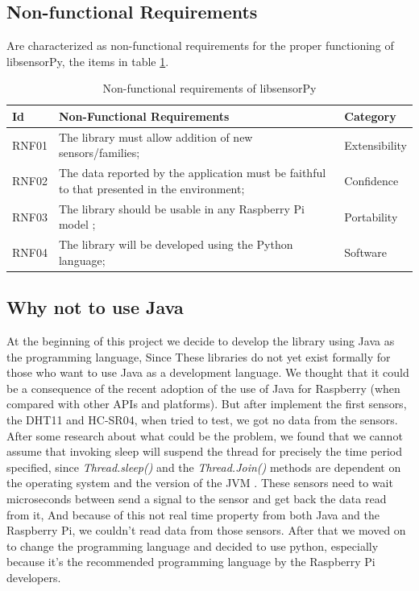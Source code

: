 \documentclass{acm_proc_article-sp}
\begin{document}
\subsection{Non-functional Requirements}
Are characterized as non-functional requirements for the proper functioning of libsensorPy, the items in table \ref{table:rnf}.

\begin{table}[h]
 \caption{Non-functional requirements of libsensorPy}
 \label{table:rnf}
 \begin{tabular}{|l|p{4.7cm}|l|}
 \hline  
 Id & Non-Functional Requirements & Category \\
 \hline  
 RNF01 & The library must allow addition of new sensors/families; & Extensibility\\
 \hline  
 RNF02 & The data reported by the application must be faithful to that presented in the environment; & Confidence \\
 \hline 
 RNF03 & The library should be usable in any Raspberry Pi model ; & Portability \\
 \hline 
 RNF04 & The library will be developed using the Python language; & Software \\
\hline  
\end{tabular}
\end{table}

\subsection{Why not to use Java}
At the beginning of this project we decide to develop the library using Java as the programming language, Since These libraries do not yet exist formally for those who want to use Java as a development language. We thought that it could be a consequence of the recent adoption of the use of Java for Raspberry (when compared with other APIs and platforms). But after implement the first sensors, the DHT11 and HC-SR04, when tried to test, we got no data from the sensors.
\newline
\newline
After some research about what could be the problem, we found that we cannot assume that invoking sleep will suspend the thread for precisely the time period specified, since \textit{Thread.sleep()} and the \textit{Thread.Join()} methods are dependent on the operating system and the version of the JVM \cite{Oracle}.
\newline
\newline
These sensors need to wait microseconds between send a signal to the sensor and get back the data read from it, And because of this not real time property from both Java and the Raspberry Pi, we couldn't read data from those sensors. After that we moved on to change the programming language and decided to use python, especially because it's the recommended programming language by the Raspberry Pi developers.
\end{document}
